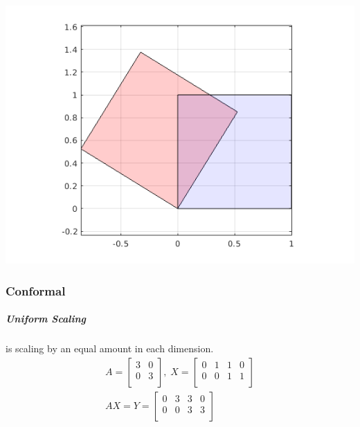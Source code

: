 \documentclass[MathsNotesBase.tex]{subfiles}
\begin{document}
{		\begin{center}
		\includegraphics[scale=0.85]{resources/img/GeometryOfMatrices_images/rotation.png}
		\end{center}
		
		\subsubsection{Conformal}
		\subparagraph{Uniform Scaling} is scaling by an equal amount in each dimension.
		\begin{align*}
		A =
		\begin{bmatrix}    
		3  &  0 \\
		0  &  3 \\		
		\end{bmatrix}
		,\; X = 
		\begin{bmatrix}  
		0   &  1  &   1  &   0 \\
		0   &  0  &   1  &   1	\\	
		\end{bmatrix} \\[10pt]
		AX = Y = 
		\begin{bmatrix}   
		0  &   3  &  3  &  0 \\
		0  &   0  &  3  &  3 \\
		\end{bmatrix}
		\end{align*}
	
}
\end{document}
